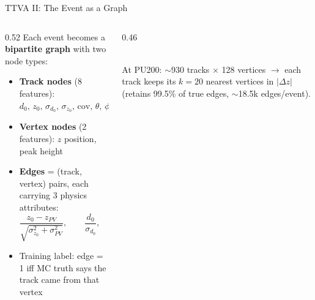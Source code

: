 \documentclass[xcolor=table,aspectratio=169]{beamer}
\begin{document}
\begin{frame}{TTVA II: The Event as a Graph}
    \begin{columns}[c]
        \begin{column}{0.52\linewidth}
            Each event becomes a \textbf{bipartite graph} with two node types:
            \begin{itemize}
                \setlength\itemsep{0.35em}
                \item \textcolor{mydarkblue}{\textbf{Track nodes}} (8 features): \(d_0,\, z_0,\, \sigma_{d_0},\, \sigma_{z_0},\, \mathrm{cov},\, \theta,\, \phi,\, p_T\)
                \item \textcolor{myorange}{\textbf{Vertex nodes}} (2 features): \(z\) position, peak height
                \item \textbf{Edges} = (track, vertex) pairs, each carrying 3 physics attributes:
                \[
                  \frac{z_0 - z_{PV}}{\sqrt{\sigma_{z_0}^2+\sigma_{PV}^2}},\qquad
                  \frac{d_0}{\sigma_{d_0}},\qquad |z_0 - z_{PV}|
                \]
                \item Training label: edge = 1 iff MC truth says the track came from that vertex
            \end{itemize}
        \end{column}
        \begin{column}{0.46\linewidth}
            \centering
            \\[6pt]
            {\scriptsize At PU200: \(\sim\)930 tracks \(\times\) 128 vertices \(\to\) each track keeps its \(k=20\)
            nearest vertices in \(|\Delta z|\) (retains 99.5\% of true edges, \(\sim\)18.5k edges/event).}
        \end{column}
    \end{columns}
\end{frame}
\end{document}
